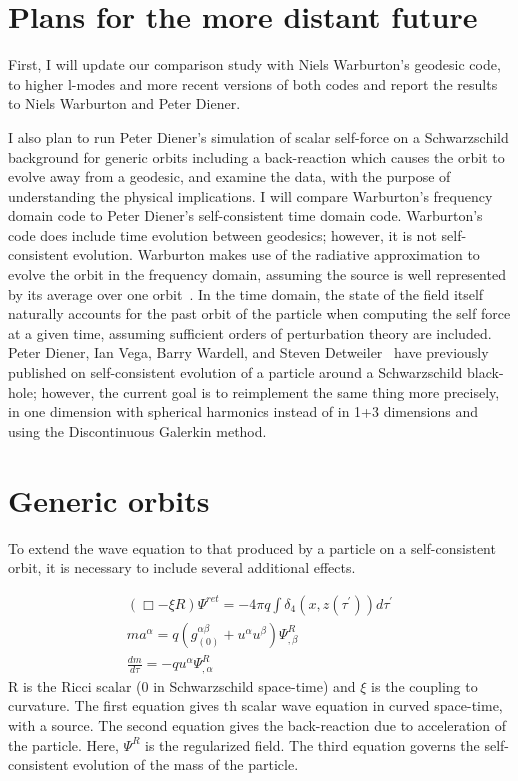 \section{Plans for the more distant future}
First, I will update our comparison study with Niels Warburton's geodesic code, to higher l-modes and more recent versions of both codes and report the results to Niels Warburton and Peter Diener.  

I also plan to run Peter Diener's simulation of scalar self-force on a Schwarzschild background for generic orbits including a back-reaction which causes the orbit to evolve away from a geodesic, and examine the data, with the purpose of understanding the physical implications. I will compare Warburton's frequency domain code to Peter Diener's self-consistent time domain code. Warburton's code does include time evolution between geodesics; however, it is not self-consistent evolution. Warburton makes use of the radiative approximation to evolve the orbit in the frequency domain, assuming the source is well represented by its average over one orbit~\cite{Warburton}. In the time domain, the state of the field itself naturally accounts for the past orbit of the particle when computing the self force at a given time, assuming sufficient orders of perturbation theory are included. Peter Diener, Ian Vega, Barry Wardell, and Steven Detweiler~\cite{diener_vega_wardell_detweiler_2012} have previously published on self-consistent evolution of a particle around a Schwarzschild black-hole; however, the current goal is to reimplement the same thing more precisely, in one dimension with spherical harmonics instead of in 1+3 dimensions and using the Discontinuous Galerkin method. 

\section{Generic orbits}
To extend the wave equation to that produced by a particle on a self-consistent orbit, it is necessary to include several additional effects.

\begin{eqnarray}
  (\Box - \xi R)\Psi^{ret} = -4\pi q \int\delta_4(x,z(\tau^\prime))d\tau^\prime\\
    ma^\alpha=q(g^{\alpha\beta}_{(0)}+u^\alpha u^\beta)\Psi^{R}_{,\beta}\\
    \frac{dm}{d\tau}=-q u^\alpha\Psi^R_{,\alpha}
    \label{genericev}
\end{eqnarray}
R is the Ricci scalar (0 in Schwarzschild space-time) and $\xi$ is the coupling to curvature. The first equation gives th scalar wave equation in curved space-time, with a source. The second equation gives the back-reaction due to acceleration of the particle. Here, $\Psi^R$ is the regularized field. The third equation governs the self-consistent evolution of the mass of the particle.~\cite{WardellSelfForceReview}

